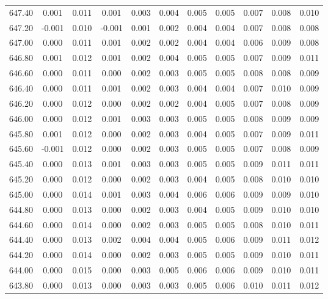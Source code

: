 \begin{longtable}{cccccccccc}
    647.40 &  0.001 &  0.011 &  0.001 &  0.003 &  0.004 &  0.005 &  0.005 &  0.007 &  0.008 &  0.010 \\
    647.20 & -0.001 &  0.010 & -0.001 &  0.001 &  0.002 &  0.004 &  0.004 &  0.007 &  0.008 &  0.008 \\
    647.00 &  0.000 &  0.011 &  0.001 &  0.002 &  0.002 &  0.004 &  0.004 &  0.006 &  0.009 &  0.008 \\
    646.80 &  0.001 &  0.012 &  0.001 &  0.002 &  0.004 &  0.005 &  0.005 &  0.007 &  0.009 &  0.011 \\
    646.60 &  0.000 &  0.011 &  0.000 &  0.002 &  0.003 &  0.005 &  0.005 &  0.008 &  0.008 &  0.009 \\
    646.40 &  0.000 &  0.011 &  0.001 &  0.002 &  0.003 &  0.004 &  0.004 &  0.007 &  0.010 &  0.009 \\
    646.20 &  0.000 &  0.012 &  0.000 &  0.002 &  0.002 &  0.004 &  0.005 &  0.007 &  0.008 &  0.009 \\
    646.00 &  0.000 &  0.012 &  0.001 &  0.003 &  0.003 &  0.005 &  0.005 &  0.008 &  0.009 &  0.009 \\
    645.80 &  0.001 &  0.012 &  0.000 &  0.002 &  0.003 &  0.004 &  0.005 &  0.007 &  0.009 &  0.011 \\
    645.60 & -0.001 &  0.012 &  0.000 &  0.002 &  0.003 &  0.005 &  0.005 &  0.007 &  0.008 &  0.009 \\
    645.40 &  0.000 &  0.013 &  0.001 &  0.003 &  0.003 &  0.005 &  0.005 &  0.009 &  0.011 &  0.011 \\
    645.20 &  0.000 &  0.012 &  0.000 &  0.002 &  0.003 &  0.004 &  0.005 &  0.008 &  0.010 &  0.010 \\
    645.00 &  0.000 &  0.014 &  0.001 &  0.003 &  0.004 &  0.006 &  0.006 &  0.009 &  0.009 &  0.010 \\
    644.80 &  0.000 &  0.013 &  0.000 &  0.002 &  0.003 &  0.004 &  0.005 &  0.009 &  0.010 &  0.010 \\
    644.60 &  0.000 &  0.014 &  0.000 &  0.002 &  0.003 &  0.005 &  0.005 &  0.008 &  0.010 &  0.011 \\
    644.40 &  0.000 &  0.013 &  0.002 &  0.004 &  0.004 &  0.005 &  0.006 &  0.009 &  0.011 &  0.012 \\
    644.20 &  0.000 &  0.014 &  0.000 &  0.002 &  0.003 &  0.005 &  0.005 &  0.009 &  0.010 &  0.011 \\
    644.00 &  0.000 &  0.015 &  0.000 &  0.003 &  0.005 &  0.006 &  0.006 &  0.009 &  0.010 &  0.011 \\
    643.80 &  0.000 &  0.013 &  0.000 &  0.003 &  0.003 &  0.005 &  0.006 &  0.010 &  0.011 &  0.012 \\

\end{longtable}
